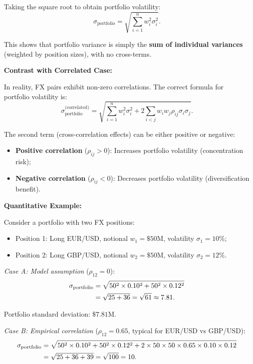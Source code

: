 Taking the square root to obtain portfolio volatility:
\begin{equation}
	\sigma_{\text{portfolio}} = \sqrt{\sum_{i=1}^n w_i^2 \sigma_i^2}.
\end{equation}

This shows that portfolio variance is simply the \textbf{sum of individual variances} (weighted by position sizes), with no cross-terms.

\textbf{Contrast with Correlated Case:}

In reality, FX pairs exhibit non-zero correlations. The correct formula for portfolio volatility is:
\begin{equation}
	\sigma_{\text{portfolio}}^{\text{(correlated)}} = \sqrt{\sum_{i=1}^n w_i^2 \sigma_i^2 + 2\sum_{i<j} w_i w_j \rho_{ij} \sigma_i \sigma_j}.
\end{equation}

The second term (cross-correlation effects) can be either positive or negative:
\begin{itemize}
	\item \textbf{Positive correlation} ($\rho_{ij} > 0$): Increases portfolio volatility (concentration risk);
	\item \textbf{Negative correlation} ($\rho_{ij} < 0$): Decreases portfolio volatility (diversification benefit).
\end{itemize}

\textbf{Quantitative Example:}

Consider a portfolio with two FX positions:
\begin{itemize}
	\item Position 1: Long EUR/USD, notional $w_1 = \$50$M, volatility $\sigma_1 = 10\%$;
	\item Position 2: Long GBP/USD, notional $w_2 = \$50$M, volatility $\sigma_2 = 12\%$.
\end{itemize}

\textit{Case A: Model assumption} ($\rho_{12} = 0$):
\begin{align}
	\sigma_{\text{portfolio}} &= \sqrt{50^2 \times 0.10^2 + 50^2 \times 0.12^2} \notag \\
	&= \sqrt{25 + 36} = \sqrt{61} \approx 7.81.
\end{align}

Portfolio standard deviation: $\$7.81$M.

\textit{Case B: Empirical correlation} ($\rho_{12} = 0.65$, typical for EUR/USD vs GBP/USD):
\begin{align}
	\sigma_{\text{portfolio}} &= \sqrt{50^2 \times 0.10^2 + 50^2 \times 0.12^2 + 2 \times 50 \times 50 \times 0.65 \times 0.10 \times 0.12} \notag \\
	&= \sqrt{25 + 36 + 39} = \sqrt{100} = 10.
\end{align}

